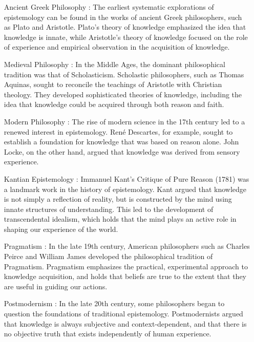 \documentclass[10pt,titlepage]{book}
\begin{document}
\begin{itemize}
\item[Ancient Greek Philosophy]: The earliest systematic explorations of epistemology can be found in the works of ancient Greek philosophers, such as Plato and Aristotle. Plato's theory of knowledge emphasized the idea that knowledge is innate, while Aristotle's theory of knowledge focused on the role of experience and empirical observation in the acquisition of knowledge.

\item[Medieval Philosophy]: In the Middle Ages, the dominant philosophical tradition was that of Scholasticism. Scholastic philosophers, such as Thomas Aquinas, sought to reconcile the teachings of Aristotle with Christian theology. They developed sophisticated theories of knowledge, including the idea that knowledge could be acquired through both reason and faith.

\item[Modern Philosophy]: The rise of modern science in the 17th century led to a renewed interest in epistemology. René Descartes, for example, sought to establish a foundation for knowledge that was based on reason alone. John Locke, on the other hand, argued that knowledge was derived from sensory experience.

\item[Kantian Epistemology]: Immanuel Kant's Critique of Pure Reason (1781) was a landmark work in the history of epistemology. Kant argued that knowledge is not simply a reflection of reality, but is constructed by the mind using innate structures of understanding. This led to the development of transcendental idealism, which holds that the mind plays an active role in shaping our experience of the world.

\item[Pragmatism]: In the late 19th century, American philosophers such as Charles Peirce and William James developed the philosophical tradition of Pragmatism. Pragmatism emphasizes the practical, experimental approach to knowledge acquisition, and holds that beliefs are true to the extent that they are useful in guiding our actions.

\item[Postmodernism]: In the late 20th century, some philosophers began to question the foundations of traditional epistemology. Postmodernists argued that knowledge is always subjective and context-dependent, and that there is no objective truth that exists independently of human experience.

\end{itemize}
\end{document}
